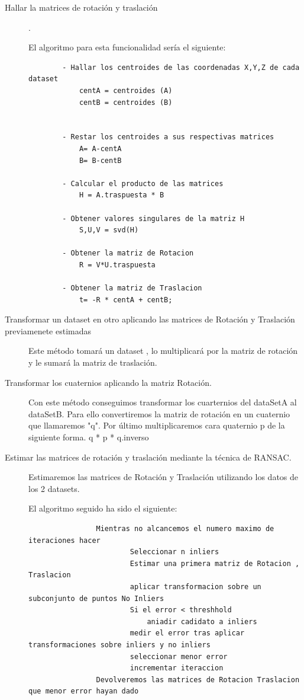 \begin{description}
	\item [Hallar la matrices de rotación y traslación] .

		El algoritmo para esta funcionalidad sería el siguiente:
        \begin{lstlisting}
        - Hallar los centroides de las coordenadas X,Y,Z de cada dataset
        	centA = centroides (A)
        	centB = centroides (B)
        

        - Restar los centroides a sus respectivas matrices
          	A= A-centA
          	B= B-centB
        
        - Calcular el producto de las matrices
        	H = A.traspuesta * B

        - Obtener valores singulares de la matriz H
        	S,U,V = svd(H)
        
        - Obtener la matriz de Rotacion
          	R = V*U.traspuesta

        - Obtener la matriz de Traslacion
        	t= -R * centA + centB;  
        \end{lstlisting}

	\item[Transformar un dataset en otro aplicando las matrices de Rotación y Traslación previamenete estimadas]

		Este método tomará un dataset , lo multiplicará por la matriz de rotación y le sumará la matriz de traslación.

	\item[Transformar los cuaternios aplicando la matriz Rotación.]

		Con este método conseguimos transformar los cuarternios del dataSetA al dataSetB.
		Para ello convertiremos la matriz de rotación en un cuaternio que llamaremos "q".
		Por último multiplicaremos cara quaternio p de la siguiente forma.
		  q * p * q.inverso 

	\item[Estimar las matrices de rotación y traslación mediante la técnica de RANSAC.]

		Estimaremos las matrices de Rotación y Traslación utilizando los datos de los 2 datasets.

		El algoritmo seguido ha sido el siguiente:
            \begin{lstlisting}
            	Mientras no alcancemos el numero maximo de iteraciones hacer
            			Seleccionar n inliers
            			Estimar una primera matriz de Rotacion , Traslacion
            			aplicar transformacion sobre un subconjunto de puntos No Inliers
            			Si el error < threshhold
            				aniadir cadidato a inliers
            			medir el error tras aplicar transformaciones sobre inliers y no inliers
            			seleccionar menor error
            			incrementar iteraccion
            	Devolveremos las matrices de Rotacion Traslacion que menor error hayan dado
            \end{lstlisting}
	        

    \end{description}


